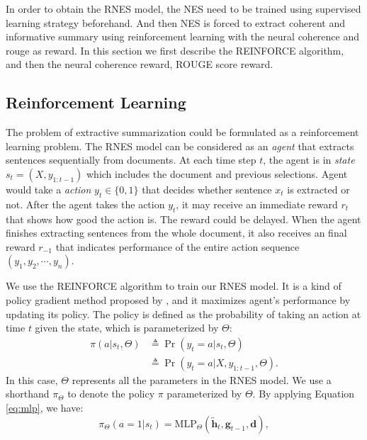 \documentclass[letterpaper]{article} %
\begin{document}
    In order to obtain the RNES model, the NES need to be trained using supervised learning strategy beforehand. And then NES  is forced to extract coherent and informative summary using reinforcement learning with the neural coherence and rouge as reward.  In this section we first describe the REINFORCE algorithm, and then the neural coherence reward, ROUGE score reward.

	\subsection{Reinforcement Learning} 

	The problem of extractive summarization could be formulated as a reinforcement learning problem. The RNES model can be considered as an \emph{agent} that extracts sentences sequentially from documents. At each time step $t$, the agent is in \emph{state} $s_t = (X, y_{1:t-1})$ which includes the document and previous selections. Agent would take a \emph{action} $y_t \in \{0,1\}$ that decides whether sentence $x_t$ is extracted or not. After the agent takes the action $y_t$, it may receive an immediate reward $r_{t}$ that shows how good the action is. The reward could be delayed. When the agent finishes extracting sentences from the whole document, it also receives an final reward $r_{-1}$ that indicates performance of the entire action sequence $(y_1, y_2, \cdots, y_n)$.
	
	We use the REINFORCE algorithm to train our RNES model. It is a kind of policy gradient method proposed by \cite{williams_simple_1992}, and it maximizes agent's performance by updating its policy. The policy is defined as the probability of taking an action at time $t$ given the state, which is parameterized by $\Theta$:
	\begin{align}
	\pi(a|s_t,\Theta) &\triangleq \Pr(y_t=a|s_t,\Theta) \\
	&\triangleq \Pr(y_t=a|X, y_{1:t-1}, \Theta) .
	\end{align}
	In this case, $\Theta$ represents all the parameters in the RNES model. We use a shorthand $\pi_{\Theta}$ to denote the policy $\pi$ parameterized by $\Theta$. By applying Equation \ref{eq:mlp}, we have:
	\begin{equation}
	\pi_{\Theta}(a=1|s_t) = \text{MLP}_{\Theta}(\overleftrightarrow{\mathbf{h}}_t, \mathbf{g}_{t-1}, \mathbf{d} ) ,
	\end{equation}
	
\end{document}
